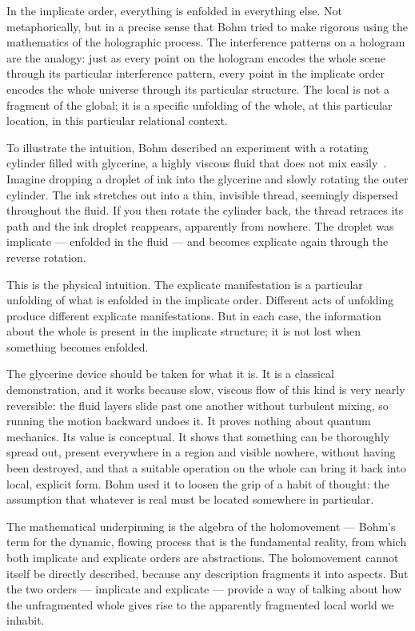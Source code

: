 In the implicate order, everything is enfolded in everything else.
Not metaphorically, but in a precise sense that Bohm tried to make rigorous using the mathematics of the holographic process.
The interference patterns on a hologram are the analogy: just as every point on the hologram encodes the whole scene through its particular interference pattern, every point in the implicate order encodes the whole universe through its particular structure.
The local is not a fragment of the global; it is a specific unfolding of the whole, at this particular location, in this particular relational context.

To illustrate the intuition, Bohm described an experiment with a rotating cylinder filled with glycerine, a highly viscous fluid that does not mix easily~\citep{Bohm1980}.
Imagine dropping a droplet of ink into the glycerine and slowly rotating the outer cylinder.
The ink stretches out into a thin, invisible thread, seemingly dispersed throughout the fluid.
If you then rotate the cylinder back, the thread retraces its path and the ink droplet reappears, apparently from nowhere.
The droplet was implicate --- enfolded in the fluid --- and becomes explicate again through the reverse rotation.

This is the physical intuition.
The explicate manifestation is a particular unfolding of what is enfolded in the implicate order.
Different acts of unfolding produce different explicate manifestations.
But in each case, the information about the whole is present in the implicate structure; it is not lost when something becomes enfolded.

The glycerine device should be taken for what it is.
It is a classical demonstration, and it works because slow, viscous flow of this kind is very nearly reversible: the fluid layers slide past one another without turbulent mixing, so running the motion backward undoes it.
It proves nothing about quantum mechanics.
Its value is conceptual.
It shows that something can be thoroughly spread out, present everywhere in a region and visible nowhere, without having been destroyed, and that a suitable operation on the whole can bring it back into local, explicit form.
Bohm used it to loosen the grip of a habit of thought: the assumption that whatever is real must be located somewhere in particular.

The mathematical underpinning is the algebra of the holomovement --- Bohm's term for the dynamic, flowing process that is the fundamental reality, from which both implicate and explicate orders are abstractions.
The holomovement cannot itself be directly described, because any description fragments it into aspects.
But the two orders --- implicate and explicate --- provide a way of talking about how the unfragmented whole gives rise to the apparently fragmented local world we inhabit.

